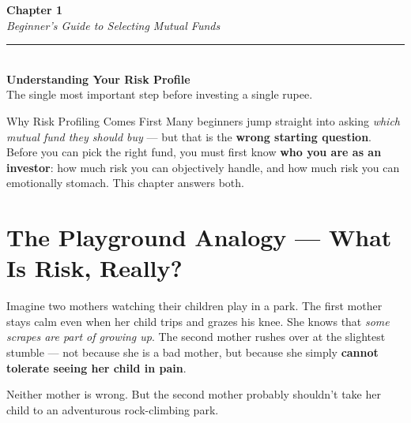 \documentclass[12pt,a4paper]{article}
\begin{document}
\begin{tcolorbox}[
  enhanced, arc=6pt, boxrule=0pt,
  colback=PrimaryBlue, colframe=PrimaryBlue,
  left=14pt, right=14pt, top=14pt, bottom=14pt
]
  {\color{white}\Huge\bfseries Chapter 1}\\[4pt]
  {\color{white!80!PrimaryBlue}\Large\textit{Beginner's Guide to Selecting Mutual Funds}}\\[10pt]
  {\color{white}\rule{\linewidth}{0.6pt}}\\[8pt]
  {\color{white}\LARGE\bfseries Understanding Your Risk Profile}\\[6pt]
  {\color{white!75!PrimaryBlue}\normalsize
   The single most important step before investing a single rupee.}
\end{tcolorbox}

\vspace{4mm}

\begin{conceptbox}{Why Risk Profiling Comes First}
Many beginners jump straight into asking \textit{which mutual fund they should buy} --- but that is the \textbf{wrong starting question}. Before you can pick the right fund, you must first know \textbf{who you are as an investor}: how much risk you can objectively handle, and how much risk you can emotionally stomach. This chapter answers both.
\end{conceptbox}

\vspace{2mm}

\section{The Playground Analogy --- What Is Risk, Really?}

Imagine two mothers watching their children play in a park. The first mother stays calm even when her child trips and grazes his knee. She knows that \textit{some scrapes are part of growing up}. The second mother rushes over at the slightest stumble --- not because she is a bad mother, but because she simply \textbf{cannot tolerate seeing her child in pain}.

Neither mother is wrong. But the second mother probably shouldn't take her child to an adventurous rock-climbing park.
\end{document}
